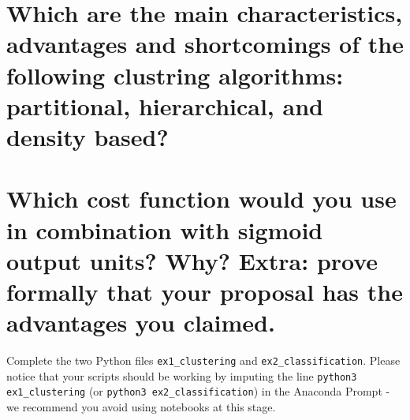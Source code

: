 \documentclass[13pt, a4paper]{exam}
\begin{document}
\begin{questions}

    \begin{parts}
        \part{Which are the main characteristics, advantages and shortcomings of the following clustring algorithms: partitional, hierarchical, and density based?}

        \part{Which cost function would you use in combination with sigmoid output units? Why? \textbf{Extra}: prove formally that your proposal has the advantages you claimed.}

    \end{parts}



    Complete the two Python files \verb|ex1_clustering| and \verb|ex2_classification|. Please notice that your scripts should be working by imputing the line \verb|python3 ex1_clustering| (or \verb|python3 ex2_classification|) in the Anaconda Prompt - we recommend you avoid using notebooks at this stage.

\end{questions}
\end{document}
